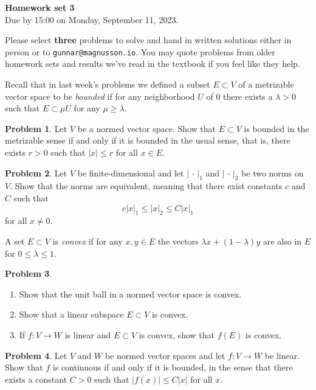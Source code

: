 \documentclass[11pt]{article}
\theoremstyle{definition}
\newtheorem{prob}{Problem}
\def\head{
\begin{center}
\textbf{\LARGE Homework set 3}
\\[3pt]
Due by 15:00 on Monday, September 11, 2023.
\end{center}
\medskip
}
\begin{document}
\head

Please select \textbf{three} problems to solve and hand in written solutions
either in person or to \verb+gunnar@magnusson.io+. You may quote problems from
older homework sets and results we've read in the textbook if you feel like
they help.

Recall that in last week's problems we defined a subset $E \subset V$ of a
metrizable vector space to be \emph{bounded} if for any neighborhood $U$ of $0$
there exists a $\lambda > 0$ such that $E \subset \mu U$ for any $\mu \geq
\lambda$.


\begin{prob}
Let $V$ be a normed vector space.
Show that $E \subset V$ is bounded in the metrizable sense
if and only if it is bounded in the usual sense, that is, there exists
$r > 0$ such that $|x| \leq r$ for all $x \in E$.
\end{prob}

\begin{prob}
Let $V$ be finite-dimensional and let
$| \, \cdot \, |_1$ and
$| \, \cdot \, |_2$ be two norms on $V$.
Show that the norms are equivalent, meaning that there exist constants $c$ and
$C$ such that
\[
c |x|_1 \leq |x|_2 \leq C|x|_1
\]
for all $x \not= 0$.
\end{prob}

A set $E \subset V$ is \emph{convex} if for any $x, y \in E$ the vectors
$\lambda x + (1 - \lambda) y$ are also in $E$ for $0 \leq \lambda \leq 1$.

\begin{prob}
\begin{enumerate}
\item
Show that the unit ball in a normed vector space is convex.

\item
Show that a linear subspace $E \subset V$ is convex.

\item
If $f : V \to W$ is linear and $E \subset V$ is convex, show that $f(E)$ is convex.
\end{enumerate}
\end{prob}

\begin{prob}
Let $V$ and $W$ be normed vector spaces and let $f : V \to W$ be linear.
Show that $f$ is continuous if and only if it is bounded, in the sense
that there exists a constant $C > 0$ such that $|f(x)| \leq C |x|$ for all $x$.
\end{prob}
\end{document}
